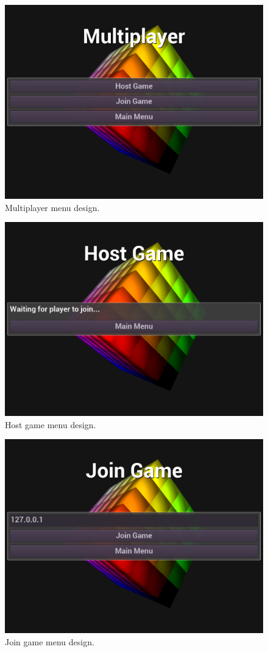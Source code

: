 \documentclass[12pt]{article}
\begin{document}
    \begin{figure}[H]
        \centering
        \includegraphics[width=4.5in]{Anttris_MPMenu.png}
        \caption{Multiplayer menu design.}
    \end{figure}
    \begin{figure}[H]
        \centering
        \includegraphics[width=4.5in]{Anttris_HGMenu.png}
        \caption{Host game menu design.}
    \end{figure}
    \begin{figure}[H]
        \centering
        \includegraphics[width=4.5in]{Anttris_JGMenu.png}
        \caption{Join game menu design.}
    \end{figure}
\end{document}
